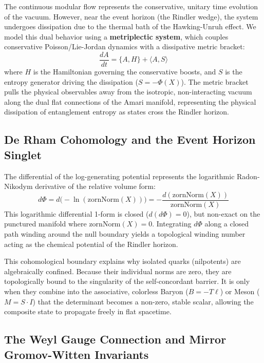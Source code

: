 \documentclass[11pt,a4paper]{article}
\begin{document}
The continuous modular flow represents the conservative, unitary time evolution of the vacuum. However, near the event horizon (the Rindler wedge), the system undergoes dissipation due to the thermal bath of the Hawking-Unruh effect. We model this dual behavior using a \textbf{metriplectic system}, which couples conservative Poisson/Lie-Jordan dynamics with a dissipative metric bracket:
\begin{equation}
\frac{dA}{dt} = \{A, H\} + \langle A, S \rangle
\end{equation}
where $H$ is the Hamiltonian governing the conservative boosts, and $S$ is the entropy generator driving the dissipation ($S = -\Phi(X)$). The metric bracket pulls the physical observables away from the isotropic, non-interacting vacuum along the dual flat connections of the Amari manifold, representing the physical dissipation of entanglement entropy as states cross the Rindler horizon.

\subsection{De Rham Cohomology and the Event Horizon Singlet}

The differential of the log-generating potential represents the logarithmic Radon-Nikodym derivative of the relative volume form:
\begin{equation}
d\Phi = d\big(-\ln(\text{zornNorm}(X))\big) = -\frac{d(\text{zornNorm}(X))}{\text{zornNorm}(X)}
\end{equation}
This logarithmic differential 1-form is closed ($d(d\Phi) = 0$), but non-exact on the punctured manifold where $\text{zornNorm}(X) = 0$. Integrating $d\Phi$ along a closed path winding around the null boundary yields a topological winding number acting as the chemical potential of the Rindler horizon. 

This cohomological boundary explains why isolated quarks (nilpotents) are algebraically confined. Because their individual norms are zero, they are topologically bound to the singularity of the self-concordant barrier. It is only when they combine into the associative, colorless Baryon ($B = -T\ell$) or Meson ($M = S \cdot I$) that the determinant becomes a non-zero, stable scalar, allowing the composite state to propagate freely in flat spacetime.

\subsection{The Weyl Gauge Connection and Mirror Gromov-Witten Invariants}
\end{document}
